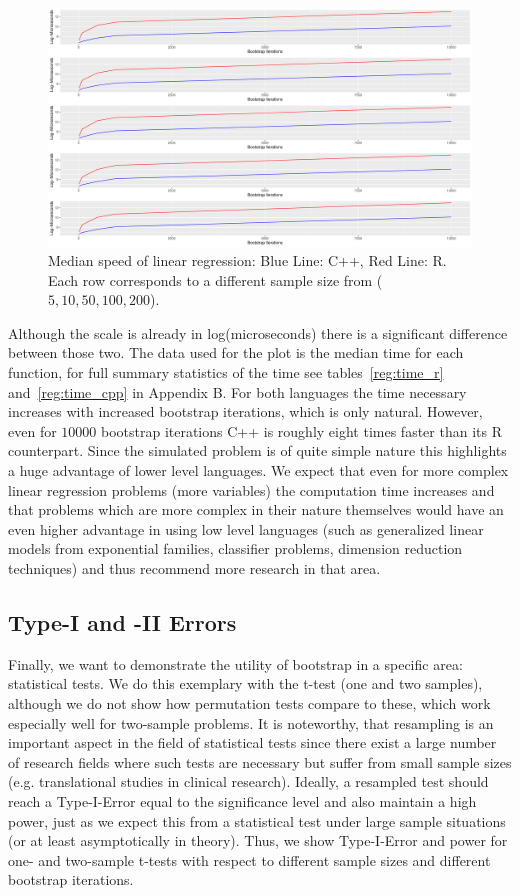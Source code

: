\begin{figure}
\centering
	\includegraphics[scale=0.4]{./figures/plot_regression.pdf}
	\caption[Regression Complexity]{Median speed of linear regression: Blue Line: C++, Red Line: R. Each row corresponds to a different sample size from ($5, 10, 50, 100, 200$).}
	\label{fig:regErr}
\end{figure}

\noindent Although the scale is already in log(microseconds) there is a significant difference between those two. The data used for the plot is the median time for each function, for full summary statistics of the time see tables~\ref{reg:time_r} and~\ref{reg:time_cpp} in Appendix B. For both languages the time necessary increases with increased bootstrap iterations, which is only natural. However, even for $10000$ bootstrap iterations C++ is roughly eight times faster than its R counterpart. Since the simulated problem is of quite simple nature this highlights a huge advantage of lower level languages. We expect that even for more complex linear regression problems (more variables) the computation time increases and that problems which are more complex in their nature themselves would have an even higher advantage in using low level languages (such as generalized linear models from exponential families, classifier problems, dimension reduction techniques) and thus recommend more research in that area.

\subsection{Type-I and -II Errors}
Finally, we want to demonstrate the utility of bootstrap in a specific area: statistical tests. We do this exemplary with the t-test (one and two samples), although we do not show how permutation tests compare to these, which work especially well for two-sample problems. It is noteworthy, that resampling is an important aspect in the field of statistical tests since there exist a large number of research fields where such tests are necessary but suffer from small sample sizes (e.g. translational studies in clinical research). Ideally, a resampled test should reach a Type-I-Error equal to the significance level and also maintain a high power, just as we expect this from a statistical test under large sample situations (or at least asymptotically in theory). Thus, we show Type-I-Error and power for one- and two-sample t-tests with respect to different sample sizes and different bootstrap iterations. 

